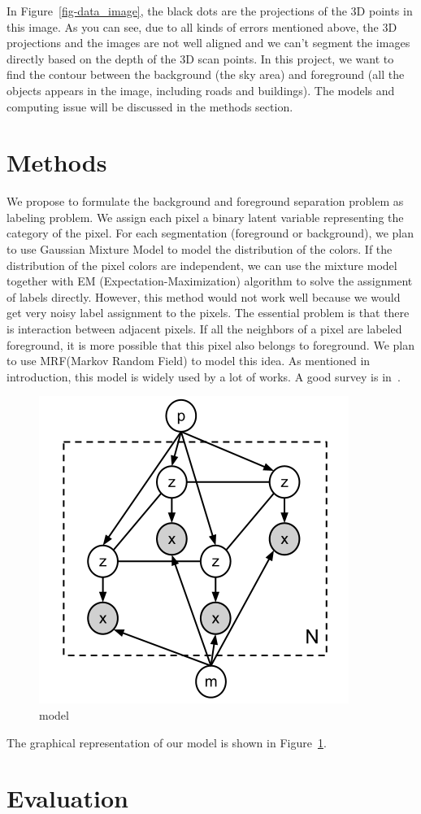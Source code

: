 \documentclass{article} %
\begin{document}
In Figure~\ref{fig-data_image}, the black dots are the projections of
the 3D points in this image. As you can see, due to all kinds of
errors mentioned above, the 3D projections and the images are not well
aligned and we can't segment the images directly based on the depth of
the 3D scan points. In this project, we want to find the contour
between the background (the sky area) and foreground (all the objects
appears in the image, including roads and buildings). The models and
computing issue will be discussed in the methods section.

\section{Methods}

We propose to formulate the background and foreground separation
problem as labeling problem. We assign each pixel a binary latent
variable representing the category of the pixel. For each
segmentation (foreground or background), we plan to use Gaussian Mixture Model to model the
distribution of the colors. If the distribution of the pixel colors
are independent, we can use the mixture model together with EM
(Expectation-Maximization) algorithm to solve the assignment of labels
directly. However, this method would not work well because we would
get very noisy label assignment to the pixels. The essential problem
is that there is interaction between adjacent pixels. If all the
neighbors of a pixel are labeled foreground, it is more possible that
this pixel also belongs to foreground. We plan to
use MRF(Markov Random Field) to model this idea. As mentioned in
introduction, this model is widely used by a lot of works. A good
survey is in~\citep{Szeliski2008Comparative}.

\begin{figure}[ht]
\begin{center}
\includegraphics[height=0.5\linewidth]{./fig/graphical_model.png}
\end{center}
\caption{model}
\label{fig-graphical_model}
\end{figure}

The graphical representation of our model is shown in
Figure~\ref{fig-graphical_model}.



\section{Evaluation}




\end{document}
